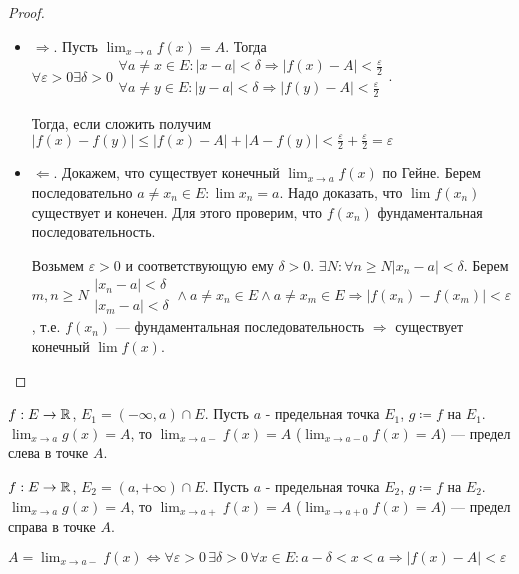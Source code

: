 \begin{proof}
    \slashn
    \begin{itemize}
        \item $\Rightarrow$. Пусть  $\lim_{x\to a} f(x) = A$. Тогда $\forall \varepsilon > 0 \exists \delta > 0 \begin{array}{l} \forall a \neq x \in E: |x-a| < \delta \Rightarrow |f(x) - A| < \frac{\varepsilon}{2} \\ \forall a \neq y \in E: |y-a| < \delta \Rightarrow |f(y) - A| < \frac{\varepsilon}{2} \end{array}$. 

            Тогда, если сложить получим $|f(x) - f(y)| \le |f(x) - A| + |A - f(y)| < \frac{\varepsilon}{2} + \frac{\varepsilon}{2} = \varepsilon$
        \item $\Leftarrow$. Докажем, что существует конечный  $\lim_{x \to a} f(x)$ по Гейне. Берем последовательно  $a \neq x_n \in E: \lim x_n = a$. Надо доказать, что $\lim f(x_n)$ существует и конечен. Для этого проверим, что $f(x_n)$ фундаментальная последовательность.

            Возьмем $\varepsilon > 0$ и соответствующую ему $\delta > 0$.  $\exists N: \forall n \ge N |x_n - a| < \delta$. Берем $m, n \ge N \begin{array}{l} |x_n - a| < \delta \\ |x_m- a| < \delta \end{array} \land a \neq x_n \in E \land a \neq x_m \in E \Rightarrow |f(x_n) - f(x_m)| < \varepsilon$, т.е. $f(x_n)$ --- фундаментальная последовательность  $\Rightarrow$ существует конечный  $\lim f(x)$.
    \end{itemize}
\end{proof}
\begin{definition}
    $f: E \to \mathbb{R}$,  $E_1 = (-\infty, a) \cap E$. Пусть  $a$ - предельная точка  $E_1$,  $g \coloneqq f$ на  $E_1$.  $\lim_{x\to a} g(x) = A$, то  $\lim_{x \to a-} f(x)= A$ ($\lim_{x \to a-0} f(x) = A$) --- предел слева в точке $A$.
\end{definition}
\begin{definition}
    $f: E \to \mathbb{R}$,  $E_2 = (a, +\infty) \cap E$. Пусть  $a$ - предельная точка  $E_2$,  $g \coloneqq f$ на  $E_2$.  $\lim_{x\to a} g(x) = A$, то  $\lim_{x \to a+} f(x)= A$ ($\lim_{x \to a+0} f(x) = A$) --- предел справа в точке $A$.
\end{definition}
\begin{remark}
    $A = \lim_{x \to a-} f(x) \iff \forall \varepsilon > 0 \, \exists \delta > 0 \, \forall x \in E: a-\delta < x < a \Rightarrow |f(x) - A| < \varepsilon$
\end{remark}
